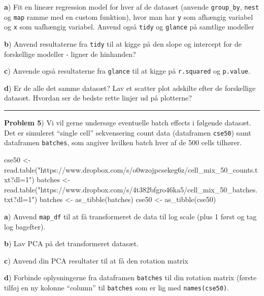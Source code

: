 \documentclass[
]{book}
\newenvironment{Shaded}{\begin{snugshade}}{\end{snugshade}}
\newcommand{\FunctionTok}[1]{\textcolor[rgb]{0.00,0.00,0.00}{#1}}
\newcommand{\NormalTok}[1]{#1}
\newcommand{\OtherTok}[1]{\textcolor[rgb]{0.56,0.35,0.01}{#1}}
\newcommand{\StringTok}[1]{\textcolor[rgb]{0.31,0.60,0.02}{#1}}
\begin{document}
\textbf{a}) Fit en lineær regression model for hver af de datasæt (anvende \texttt{group\_by}, \texttt{nest} og \texttt{map} ramme med en custom funktion), hvor man har \texttt{y} som afhængig variabel og \texttt{x} som uafhængig variabel. Anvend også \texttt{tidy} og \texttt{glance} på samtlige modeller

\textbf{b}) Anvend resultaterne fra \texttt{tidy} til at kigge på den slope og intercept for de forskellige modeller - ligner de hinhanden?

\textbf{c}) Anvende også resultaterne fra \texttt{glance} til at kigge på \texttt{r.squared} og \texttt{p.value}.

\textbf{d}) Er de alle det samme datasæt? Lav et scatter plot adskilte efter de forskellige datasæt. Hvordan ser de bedste rette linjer ud på plotterne?

\begin{center}\rule{0.5\linewidth}{0.5pt}\end{center}

\textbf{Problem 5}) Vi vil gerne undersøge eventuelle batch effects i følgende datasæt. Det er simuleret ``single cell'' sekvensering count data (dataframen \texttt{cse50}) samt dataframen \texttt{batches}, som angiver hvilken batch hver af de 500 cells tilhører.

\begin{Shaded}
\begin{Highlighting}[]
\NormalTok{cse50 }\OtherTok{\textless{}{-}} \FunctionTok{read.table}\NormalTok{(}\StringTok{"https://www.dropbox.com/s/o0wzojpcsekeg6z/cell\_mix\_50\_counts.txt?dl=1"}\NormalTok{)}
\NormalTok{batches }\OtherTok{\textless{}{-}} \FunctionTok{read.table}\NormalTok{(}\StringTok{"https://www.dropbox.com/s/4t382bfgro46ka5/cell\_mix\_50\_batches.txt?dl=1"}\NormalTok{)}
\NormalTok{batches }\OtherTok{\textless{}{-}} \FunctionTok{as\_tibble}\NormalTok{(batches)}
\NormalTok{cse50 }\OtherTok{\textless{}{-}} \FunctionTok{as\_tibble}\NormalTok{(cse50)}
\end{Highlighting}
\end{Shaded}

\textbf{a}) Anvend \texttt{map\_df} til at få transformeret de data til log scale (plus 1 først og tag log bagefter).

\textbf{b}) Lav PCA på det transformeret datasæt.

\textbf{c}) Anvend din PCA resultater til at få den rotation matrix

\textbf{d}) Forbinde oplysningerne fra dataframen \texttt{batches} til din rotation matrix (første tilføj en ny kolonne ``column'' til \texttt{batches} som er lig med \texttt{names(cse50)}.
\end{document}

